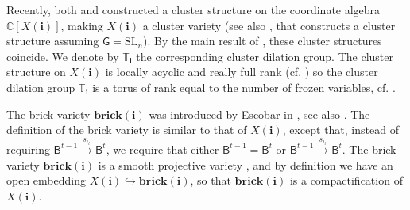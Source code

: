 \documentclass[a4paper, 11pt]{amsart}
\newcommand{\brick}{\mathbf{brick}}
\newcommand{\SL}{\mathrm{SL}}
\newcommand{\flag}[1]{\mathsf{B}^{#1}}
\newcommand{\rel}[1]{\xrightarrow{#1}}
\newcommand{\word}[1]{\mathbf{#1}}
\newcommand{\group}{\mathsf{G}}
\newcommand{\C}{\mathbb{C}}
\newcommand{\dil}[1]{\mathbb{T}_{#1}}
\theoremstyle{definition}
\begin{document}
Recently, both \cite{CGGLSS} and \cite{GLSB} constructed a cluster structure on the coordinate algebra $\C[X(\word{i})]$, making $X(\word{i})$ a cluster variety (see also \cite{GLSBS}, that constructs a cluster structure assuming $\group = \SL_n$). By the main result of \cite{CGGSSBS}, these cluster structures coincide. We denote by $\dil{\word{i}}$ the corresponding cluster dilation group. The cluster structure on $X(\word{i})$ is locally acyclic and really full rank (cf. \cite[Theorem 7.13, Corollary 8.5]{CGGLSS}) so the cluster dilation group $\dil{\word{i}}$ is a torus of rank equal to the number of frozen variables, cf. \cite[Proposition 5.1]{LamSpeyer-I}.

The brick variety $\brick(\word{i})$ was introduced by Escobar in \cite{escobar}, see also \cite[Appendix A]{KLS_projections}. The definition of the brick variety is similar to that of $X(\word{i})$, except that, instead of requiring $\flag{t-1} \rel{s_{i_t}} \flag{t}$, we require that either $\flag{t-1} = \flag{t}$ or $\flag{t-1} \rel{s_{i_t}} \flag{t}$. The brick variety $\brick({\word{i}})$ is a smooth projective variety \cite[Theorem 20]{escobar}, and by definition we have an open embedding $X(\word{i}) \hookrightarrow \brick(\word{i})$, so that $\brick(\word{i})$ is a compactification of $X(\word{i})$. 
\end{document}
